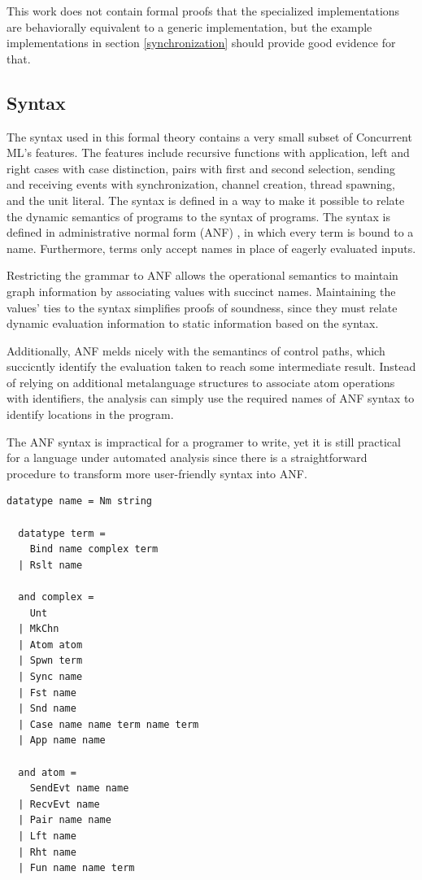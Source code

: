 \documentclass[letterpaper, 11pt]{report}
\begin{document}
This work does not contain formal proofs that the specialized implementations are
behaviorally equivalent to a generic implementation, but the example implementations in 
section \ref{synchronization} should provide good evidence for that.

\subsection{Syntax}
The syntax used in this formal theory contains a very small subset of
Concurrent ML's features. The features include recursive functions with
application, left and right cases with case distinction, pairs with first
and second selection, sending and receiving events with synchronization,
channel creation, thread spawning, and the unit literal. The syntax is defined in a way to
make it possible to relate the dynamic semantics of programs to the syntax of programs.
The syntax is defined in administrative normal form (ANF) \cite{flanagan1993essence}, in which every term
is bound to a name. Furthermore, terms only accept names in place of eagerly evaluated
inputs. 

Restricting the grammar to ANF allows the operational semantics
to maintain graph information by associating values with succinct names.
Maintaining the values' ties to the syntax
simplifies proofs of soundness, since they must relate dynamic evaluation information
to static information based on the syntax.

Additionally, ANF melds nicely with the semantincs of control paths, which succicntly identify
the evaluation taken to reach some intermediate result.
Instead of relying on additional metalanguage structures to associate atom operations with identifiers,
the analysis can simply use the required names of ANF syntax to identify locations in the program.

The ANF syntax is impractical for a programer to write,
yet it is still practical for a language under automated analysis
since there is a straightforward procedure to transform
more user-friendly syntax into ANF.

\begin{lstlisting}[language=logic]
  datatype name = Nm string

  datatype term = 
    Bind name complex term 
  | Rslt name

  and complex = 
    Unt
  | MkChn
  | Atom atom
  | Spwn term 
  | Sync name
  | Fst name
  | Snd name
  | Case name name term name term 
  | App name name

  and atom = 
    SendEvt name name
  | RecvEvt name
  | Pair name name
  | Lft name
  | Rht name
  | Fun name name term 
\end{lstlisting}
\end{document}
